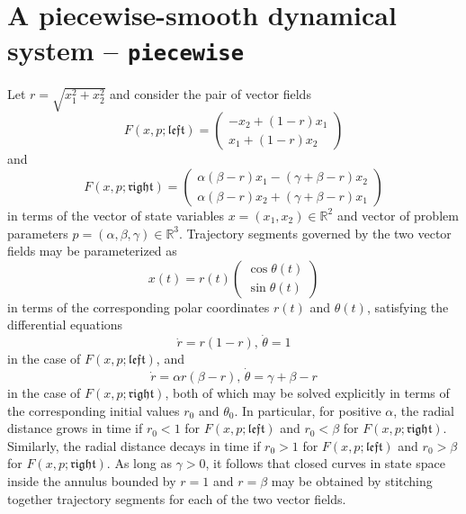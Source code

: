 \section{A piecewise-smooth dynamical system -- \texttt{piecewise}}
Let $r=\sqrt{x_1^2+x_2^2}$ and consider the pair of vector fields
\begin{equation}
F(x,p;\mathfrak{left})=\left(\begin{array}{r}-x_2+(1-r)x_1\\x_1+(1-r)x_2\end{array}\right)
\end{equation}
and
\begin{equation}
F(x,p;\mathfrak{right})=\left(\begin{array}{c}\alpha(\beta-r)x_1-(\gamma+\beta-r)x_2\\\alpha(\beta-r)x_2+(\gamma+\beta-r)x_1\end{array}\right)
\end{equation}
in terms of the vector of state variables $x=(x_1,x_2)\in\mathbb{R}^2$ and vector of problem parameters $p=(\alpha,\beta,\gamma)\in\mathbb{R}^3$. Trajectory segments governed by the two vector fields may be parameterized as
\begin{equation}
x(t)=r(t)\left(\begin{array}{c}\cos\theta(t)\\\sin\theta(t)\end{array}\right)
\end{equation}
in terms of the corresponding polar coordinates $r(t)$ and $\theta(t)$, satisfying the differential equations
\begin{equation}
\dot{r}=r(1-r),\,\dot{\theta}=1
\end{equation}
in the case of $F(x,p;\mathfrak{left})$, and
\begin{equation}
\dot{r}=\alpha r(\beta-r),\,\dot{\theta}=\gamma+\beta-r
\end{equation}
in the case of $F(x,p;\mathfrak{right})$, both of which may be solved explicitly in terms of the corresponding initial values $r_0$ and $\theta_0$. In particular, for positive $\alpha$, the radial distance grows in time if $r_0<1$ for $F(x,p;\mathfrak{left})$ and $r_0<\beta$ for $F(x,p;\mathfrak{right})$. Similarly, the radial distance decays in time if $r_0>1$ for $F(x,p;\mathfrak{left})$ and $r_0>\beta$ for $F(x,p;\mathfrak{right})$. As long as $\gamma>0$, it follows that closed curves in state space inside the annulus bounded by $r=1$ and $r=\beta$ may be obtained by stitching together trajectory segments for each of the two vector fields.

